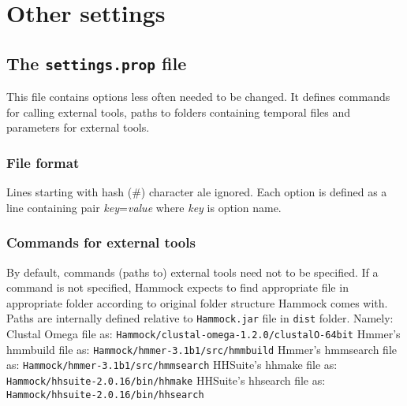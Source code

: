 \documentclass[11pt, a4paper, twoside, titlepage]{article}
\begin{document}
\section{Other settings}
\label{othersettings}
\subsection{The \texttt{settings.prop} file}
\label{settings.propfile}
This file contains options less often needed to be changed. It defines commands for calling external tools, paths to folders containing temporal files and parameters for external tools. 

\subsubsection{File format}
Lines starting with hash (\#) character ale ignored.\newline
Each option is defined as a line containing pair \textit{key}=\textit{value} where \textit{key} is option name. 

\subsubsection{Commands for external tools}
By default, commands (paths to) external tools need not to be specified. If a command is not specified, Hammock expects to find appropriate file in appropriate folder according to original folder structure Hammock comes with. Paths are internally defined relative to \texttt{Hammock.jar} file in \texttt{dist} folder. Namely: \newline\newline
Clustal Omega file as: \texttt{Hammock/clustal-omega-1.2.0/clustalO-64bit}\newline
Hmmer's hmmbuild file as: \texttt{Hammock/hmmer-3.1b1/src/hmmbuild}\newline
Hmmer's hmmsearch file as: \texttt{Hammock/hmmer-3.1b1/src/hmmsearch}\newline
HHSuite's hhmake file as: \texttt{Hammock/hhsuite-2.0.16/bin/hhmake}\newline
HHSuite's hhsearch file as: \texttt{Hammock/hhsuite-2.0.16/bin/hhsearch}\newline
\end{document}
